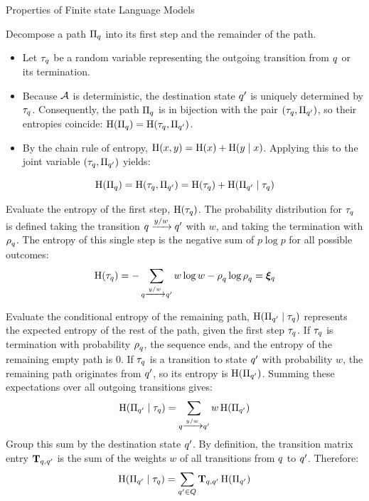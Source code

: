 \begin{question}{Properties of Finite state Language Models}
\begin{subquestion}
Decompose a path $\Pi_\stateq$ into its first step and the remainder of the path.
\begin{itemize}
    \item Let $\tau_\stateq$ be a random variable representing the outgoing transition from $\stateq$ or its termination.
    \item Because $\automaton$ is deterministic, the destination state $\stateq'$ is uniquely determined by $\tau_\stateq$. Consequently, the path $\Pi_\stateq$ is in bijection with the pair $(\tau_\stateq, \Pi_{\stateq'})$, so their entropies coincide: $\ent(\Pi_\stateq) = \ent(\tau_\stateq, \Pi_{\stateq'})$.
    \item By the chain rule of entropy, $\ent(x, y) = \ent(x) + \ent(y \mid x)$. Applying this to the joint variable $(\tau_\stateq, \Pi_{\stateq'})$ yields:
\end{itemize}
\begin{equation}
    \ent(\Pi_\stateq) = \ent(\tau_\stateq, \Pi_{\stateq'}) = \ent(\tau_\stateq) + \ent(\Pi_{\stateq'} \mid \tau_\stateq)
\end{equation}

Evaluate the entropy of the first step, $\ent(\tau_\stateq)$. The probability distribution for $\tau_\stateq$ is defined taking the transition $\stateq \xrightarrow{\sym/w} \stateq'$ with $w$, and taking the termination with $\finalf_\stateq$. The entropy of this single step is the negative sum of $p \log p$ for all possible outcomes:
\begin{equation}
    \ent(\tau_\stateq) = -\sum_{\stateq \xrightarrow{\sym/w} \stateq'} w \log w - \finalf_\stateq \log \finalf_\stateq = \boldsymbol{\xi}_\stateq
\end{equation}

Evaluate the conditional entropy of the remaining path, $\ent(\Pi_{\stateq'} \mid \tau_\stateq)$ represents the expected entropy of the rest of the path, given the first step $\tau_\stateq$.
If $\tau_\stateq$ is termination with probability $\finalf_\stateq$, the sequence ends, and the entropy of the remaining empty path is 0.
If $\tau_\stateq$ is a transition to state $\stateq'$ with probability $w$, the remaining path originates from $\stateq'$, so its entropy is $\ent(\Pi_{\stateq'})$.
Summing these expectations over all outgoing transitions gives:
\begin{equation}
    \ent(\Pi_{\stateq'} \mid \tau_\stateq) = \sum_{\stateq \xrightarrow{\sym/w} \stateq'} w\, \ent(\Pi_{\stateq'})
\end{equation}
Group this sum by the destination state $\stateq'$. 
By definition, the transition matrix entry $\transMtx_{\stateq, \stateq'}$ is the sum of the weights $w$ of all transitions from $\stateq$ to $\stateq'$. 
Therefore:
\begin{equation}
    \ent(\Pi_{\stateq'} \mid \tau_\stateq) = \sum_{\stateq' \in \states} \transMtx_{\stateq, \stateq'}\, \ent(\Pi_{\stateq'})
\end{equation}


\end{subquestion}
\end{question}
